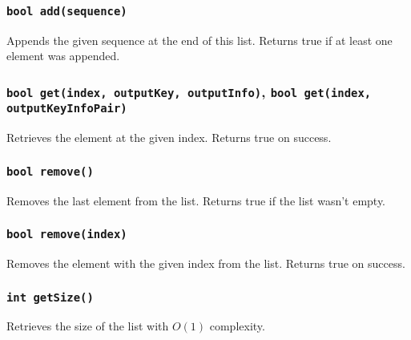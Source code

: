 ﻿\documentclass{article}
\begin{document}
\subsubsection{{\tt bool add(sequence)}}

Appends the given sequence at the end of this list. Returns true if at least one element was appended.

\subsubsection{{\tt bool get(index, outputKey, outputInfo)}, {\tt bool get(index, outputKeyInfoPair)}}

Retrieves the element at the given index. Returns true on success.

\subsubsection{{\tt bool remove()}}

Removes the last element from the list. Returns true if the list wasn't empty.

\subsubsection{{\tt bool remove(index)}}

Removes the element with the given index from the list. Returns true on success.

\subsubsection{{\tt int getSize()}}

Retrieves the size of the list with $O(1)$ complexity.
\end{document}
